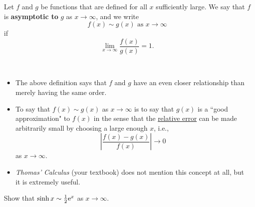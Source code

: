 \newpage

\begin{definition}
Let $f$ and $g$ be functions that are defined for all $x$ sufficiently large.
We say that $f$ is \textbf{asymptotic to} $g$ as $x\to \infty$, and we write
\begin{equation*}
f(x) \sim g(x) \text{ as } x\to \infty
\end{equation*}
if
\begin{equation*}
\lim_{x\to\infty}\frac{f(x)}{g(x)} = 1.
\end{equation*}
\end{definition}

\begin{remark}\,
\begin{itemize}
\item The above definition says that $f$ and $g$ have an even closer relationship than merely having the same order.
\item To say that $f(x)\sim g(x)$ as $x\to \infty$  is to say that $g(x)$ is a ``good approximation" to $f(x)$ in the sense that the \underline{relative error} can be made arbitrarily small by choosing a large enough $x$, i.e., 
\begin{equation*}
\left|\frac{f(x) - g(x)}{f(x)}\right|\to 0
\end{equation*}
as $x\to\infty$.
\item \textit{Thomas' Calculus} (your textbook) does not mention this concept at all, but it is extremely useful.
\end{itemize}
\end{remark}

\begin{example}
Show that $\sinh x\sim \frac{1}{2}\mathrm{e}^x$ as $x\to\infty$.
\end{example}
